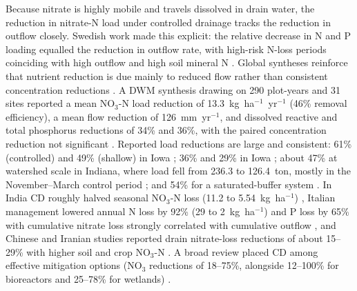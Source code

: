 Because nitrate is highly mobile and travels dissolved in drain water, the
reduction in nitrate-N load under controlled drainage tracks the reduction in
outflow closely. Swedish work made this explicit: the relative decrease in N and
P loading equalled the reduction in outflow rate, with high-risk N-loss periods
coinciding with high outflow and high soil mineral N \parencite{Wesström2007}.
Global syntheses reinforce that nutrient reduction is due mainly to reduced flow
rather than consistent concentration reductions
\parencite{Frankenberger2024,Wang2020c}. A DWM synthesis drawing on 290
plot-years and 31 sites reported a mean NO$_3$-N load reduction of
13.3~kg~ha$^{-1}$~yr$^{-1}$ (46\% removal efficiency), a mean flow reduction of
126~mm~yr$^{-1}$, and dissolved reactive and total phosphorus reductions of 34\%
and 36\%, with the paired concentration reduction not significant
\parencite{Frankenberger2024}. Reported load reductions are large and
consistent: 61\% (controlled) and 49\% (shallow) in Iowa \parencite{Schott2017};
36\% and 29\% in Iowa \parencite{Helmers2012}; about 47\% at watershed scale in
Indiana, where load fell from 236.3 to 126.4~ton, mostly in the
November--March control period \parencite{Ale2012}; and 54\% for a
saturated-buffer system \parencite{Ghane2025}. In India CD roughly halved
seasonal NO$_3$-N loss (11.2 to 5.54~kg~ha$^{-1}$) \parencite{Karegoudar2019},
Italian management lowered annual N loss by 92\% (29 to 2~kg~ha$^{-1}$) and P
loss by 65\% with cumulative nitrate loss strongly correlated with cumulative
outflow \parencite{Tolomio2018}, and Chinese and Iranian studies reported drain
nitrate-loss reductions of about 15--29\% with higher soil and crop NO$_3$-N
\parencite{Dou2021,Dou2023,Jouni2018}. A broad review placed CD among effective
mitigation options (NO$_3$ reductions of 18--75\%, alongside 12--100\% for
bioreactors and 25--78\% for wetlands) \parencite{Castellano2019}.

